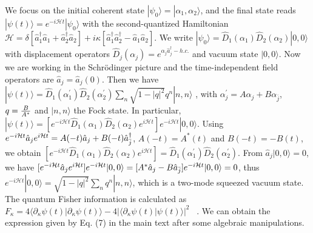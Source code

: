 \documentclass[twocolumn,prl,floatfix,citeautoscript,nofootinbib,superscriptaddress]{revtex4}
\begin{document}
\begin{widetext}
We focus on the initial coherent state $|\psi _{0}\rangle =|\alpha
_{1},\alpha _{2}\rangle $, and the final state reads $|\psi (t)\rangle =e^{-i%
\mathcal{H}t}|\psi _{0}\rangle $ with the second-quantized Hamiltonian $%
\mathcal{H}=\delta \left[ \hat{a}_{1}^{\dag }\hat{a}_{1}+\hat{a}_{2}^{\dag }%
\hat{a}_{2}\right] +i\kappa \left[ \hat{a}_{1}^{\dag }\hat{a}_{2}^{\dag }-%
\hat{a}_{1}\hat{a}_{2}\right] $. We write $|\psi _{0}\rangle =\hat{D}%
_{1}(\alpha _{1})\hat{D}_{2}(\alpha _{2})|0,0\rangle $ with displacement
operators $\hat{D}_{j}(\alpha _{j})=e^{\alpha _{j}\hat{a}_{j}^{\dag }-h.c.}$
and vacuum state $|0,0\rangle $. Now we are working in the Schr\"{o}dinger
picture and the time-independent field operators are $\hat{a}_{j}=\hat{a}%
_{j}(0)$. Then we have $|\psi (t)\rangle =\hat{D}_{1}(\alpha _{1}^{\prime })%
\hat{D}_{2}(\alpha _{2}^{\prime })\sum_{n}\sqrt{1-|q|^{2}}q^{n}|n,n\rangle $%
, with $\alpha _{j}^{\prime }=A\alpha _{j}+B\alpha _{\bar{j}}$, $q=\frac{B}{%
A^{\ast }}$ and $|n,n\rangle $ the Fock state. In particular, $|\psi
(t)\rangle =[e^{-i\mathcal{H}t}\hat{D}_{1}(\alpha _{1})\hat{D}_{2}(\alpha
_{2})e^{i\mathcal{H}t}]e^{-i\mathcal{H}t}|0,0\rangle $. Using $e^{-i\mathcal{%
H}t}\hat{a}_{j}e^{i\mathcal{H}t}=A(-t)\hat{a}_{j}+B(-t)\hat{a}_{\bar{j}%
}^{\dag }$, $A(-t)=A^{\ast }(t)$ and $B(-t)=-B(t)$, we obtain $[e^{-i%
\mathcal{H}t}\hat{D}_{1}(\alpha _{1})\hat{D}_{2}(\alpha _{2})e^{i\mathcal{H}%
t}]=\hat{D}_{1}(\alpha _{1}^{\prime })\hat{D}_{2}(\alpha _{2}^{\prime })$.
From $\hat{a}_{j}|0,0\rangle =0$, we have $[e^{-i\mathcal{H}t}\hat{a}_{j}e^{i%
\mathcal{H}t}]e^{-i\mathcal{H}t}|0,0\rangle =[A^{\ast }\hat{a}_{j}-B\hat{a}_{%
\bar{j}}]e^{-i\mathcal{H}t}|0,0\rangle =0$, thus $e^{-i\mathcal{H}%
t}|0,0\rangle =\sqrt{1-|q|^{2}}\sum_{n}q^{n}|n,n\rangle $, which is a
two-mode squeezed vacuum state. The quantum Fisher information is calculated
as $F_{\kappa }=4\langle \partial _{\kappa }\psi (t)|\partial _{\kappa }\psi
(t)\rangle -4|\langle \partial _{\kappa }\psi (t)|\psi (t)\rangle |^{2}$~%
\cite{RevModPhys.90.035005S}. We can obtain the expression given by Eq. (7)
in the main text after some algebraic manipulations.


\end{widetext}
\end{document}
